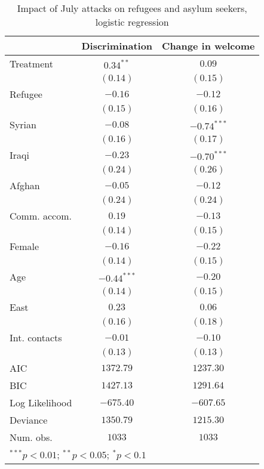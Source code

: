 
\begin{table}
\caption{Impact of July attacks on refugees and asylum seekers, logistic regression}
\begin{center}
\begin{tabular}{l c c}
\toprule
 & Discrimination & Change in welcome \\
\midrule
Treatment      & $0.34^{**}$   & $0.09$        \\
               & $(0.14)$      & $(0.15)$      \\
Refugee        & $-0.16$       & $-0.12$       \\
               & $(0.15)$      & $(0.16)$      \\
Syrian         & $-0.08$       & $-0.74^{***}$ \\
               & $(0.16)$      & $(0.17)$      \\
Iraqi          & $-0.23$       & $-0.70^{***}$ \\
               & $(0.24)$      & $(0.26)$      \\
Afghan         & $-0.05$       & $-0.12$       \\
               & $(0.24)$      & $(0.24)$      \\
Comm. accom.   & $0.19$        & $-0.13$       \\
               & $(0.14)$      & $(0.15)$      \\
Female         & $-0.16$       & $-0.22$       \\
               & $(0.14)$      & $(0.15)$      \\
Age            & $-0.44^{***}$ & $-0.20$       \\
               & $(0.14)$      & $(0.15)$      \\
East           & $0.23$        & $0.06$        \\
               & $(0.16)$      & $(0.18)$      \\
Int. contacts  & $-0.01$       & $-0.10$       \\
               & $(0.13)$      & $(0.13)$      \\
\midrule
AIC            & $1372.79$     & $1237.30$     \\
BIC            & $1427.13$     & $1291.64$     \\
Log Likelihood & $-675.40$     & $-607.65$     \\
Deviance       & $1350.79$     & $1215.30$     \\
Num. obs.      & $1033$        & $1033$        \\
\bottomrule
\multicolumn{3}{l}{\scriptsize{$^{***}p<0.01$; $^{**}p<0.05$; $^{*}p<0.1$}}
\end{tabular}
\label{tab_host_glm}
\end{center}
\end{table}
